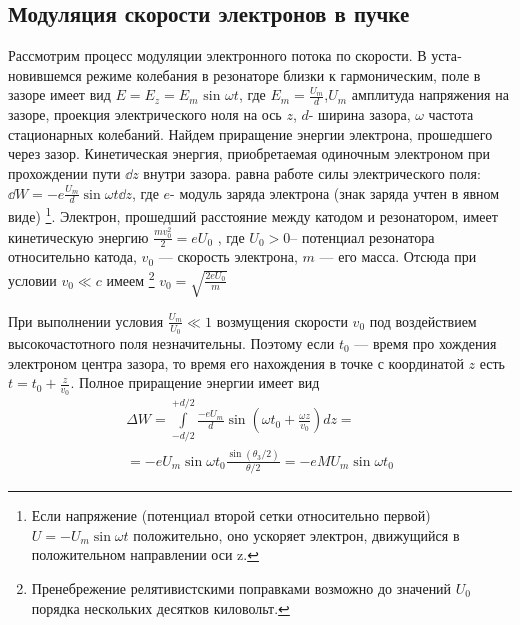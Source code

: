\subsection{Модуляция скорости электронов в пучке}
Рассмотрим процесс модуляции электронного потока по скорости. В уста­новившемся режиме колебания в резонаторе близки к гармоническим, поле
в зазоре имеет вид 
$E = E _ { z } = E _ { m } \text { sin } \omega t$, 
где $E _ { m } = \frac { U _ { m } } { d }$,$U _ { m }$ амплитуда напряжения на зазоре, проекция электрического ноля на ось $z$,
$d$- ширина зазора, $\omega$ частота стационарных колебаний. Найдем приращение энергии электрона, прошедшего через зазор. Кинетическая энергия,
приобретаемая одиночным электроном при прохождении пути $\dd z$ внутри за­зора. равна работе силы электрического поля: 
$\dd W = - e \frac { U _ { m } } { d } \sin \omega t \dd z$, где
$e$- модуль заряда электрона (знак заряда учтен в явном виде)
\footnote{Если напряжение (потенциал второй сетки относительно первой) $U = -U_m \sin \omega t$ положительно, оно ускоряет электрон, движущийся в положительном направлении оси z.}. Электрон,
прошедший расстояние между катодом и резонатором, имеет кинетическую
энергию 
$\frac { m v _ { 0 } ^ { 2 } } { 2 } = e U _ { 0 }$ , где $U_0 > 0$-- потенциал резонатора относительно ка­тода, $v_0$ — скорость электрона, $m$ — его масса. Отсюда при условии $v _ { 0 } \ll c$
имеем
\footnote{Пренебрежение релятивистскими поправками возможно до значений $U_0$ порядка нескольких
десятков киловольт.} 
$v _ { 0 } = \sqrt { \frac { 2 e U _ { 0 } } { m } }$

При выполнении условия 
$\frac { U _ { m } } { U _ { 0 } } \ll 1$ возмущения скорости $v_0$ под воздействием высокочастотного поля незначительны. Поэтому если $t_0$ — время про­
хождения электроном центра зазора, то время его нахождения в точке с
координатой $z$ есть $t = t _ { 0 } + \frac { z } { v _ { 0 } }$. Полное приращение энергии имеет вид
\begin{gather*}
	 { \Delta W = \int\limits _ { - d / 2 }^{{ + d / 2 }} \frac { - e U _ { m } } { d } \sin \left( \omega t _ { 0 } + \frac { \omega z } { v _ { 0 } } \right) d z = } \\ 
	 { = - e U _ { m } \sin \omega t _ { 0 } \frac { \sin \left( \theta _ { 3 } / 2 \right) } { \theta / 2 } = - e M U _ { m } \sin \omega t _ { 0 } } 
\end{gather*}

